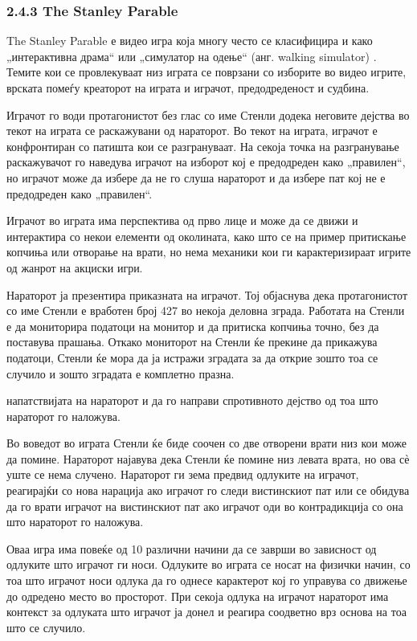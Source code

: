 \subsubsection{2.4.3 The Stanley Parable}

The Stanley Parable е видео игра која многу често се класифицира и како „интерактивна драма“ или „симулатор на одење“ (анг. walking simulator) \cite{ref18}. Темите кои се провлекуваат низ играта се поврзани со изборите во видео игрите, врската помеѓу креаторот на играта и играчот, предодреденост и судбина.

Играчот го води протагонистот без глас со име Стенли додека неговите дејства во текот на играта се раскажувани од нараторот. Во текот на играта, играчот е конфронтиран со патишта кои се разгрануваат. На секоја точка на разгранување раскажувачот го наведува играчот на изборот кој е предодреден како „правилен“, но играчот може да избере да не го слуша нараторот и да избере пат кој не е предодреден како „правилен“.

Играчот во играта има перспектива од прво лице и може да се движи и интерактира со некои елементи од околината, како што се на пример притискање копчиња или отворање на врати, но нема механики кои ги карактеризираат игрите од жанрот на акциски игри.

Нараторот ја презентира приказната на играчот. Тој објаснува дека протагонистот со име Стенли е вработен број 427 во некоја деловна зграда. Работата на Стенли е да мониторира податоци на монитор и да притиска копчиња точно, без да поставува прашања. Откако мониторот на Стенли ќе прекине да прикажува податоци, Стенли ќе мора да ја истражи зградата за да открие зошто тоа се случило и зошто зградата е комплетно празна.


напатствијата на нараторот и да го направи спротивното дејство од тоа што нараторот го наложува.

Во воведот во играта Стенли ќе биде соочен со две отворени врати низ кои може да помине. Нараторот најавува дека Стенли ќе помине низ левата врата, но ова сѐ уште се нема случено. Нараторот ги зема предвид одлуките на играчот, реагирајќи со нова нарација ако играчот го следи вистинскиот пат или се обидува да го врати играчот на вистинскиот пат ако играчот оди во контрадикција со она што нараторот го наложува.

Оваа игра има повеќе од 10 различни начини да се заврши во зависност од одлуките што играчот ги носи. Одлуките во играта се носат на физички начин, со тоа што играчот носи одлука да го однесе карактерот кој го управува со движење до одредено место во просторот. При секоја одлука на играчот нараторот има контекст за одлуката што играчот ја донел и реагира соодветно врз основа на тоа што се случило.

